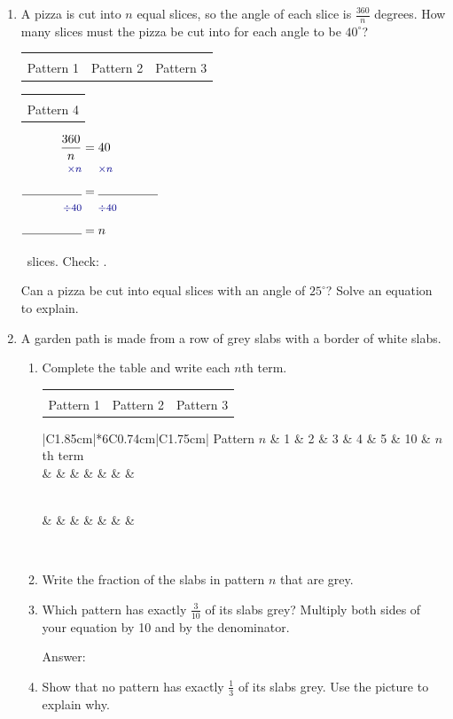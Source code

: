 \documentclass[11pt,a4paper]{article}
\makeatletter
\newcommand{\gap}{\underline{\hspace{0.95cm}}}
\newcommand{\ansline}[1][2.2cm]{\underline{\hspace{#1}}}
\newcommand{\workspace}[1]{\par\vspace{#1}\hfill Answer: \ansline[3.5cm]\par}
\newcommand{\rowstrut}{\rule[-1.9mm]{0pt}{5.8mm}}
\newenvironment{working}
  {\(\renewcommand{\arraystretch}{1.06}\begin{array}{@{}r@{\;}c@{\;}l@{}}}
  {\end{array}\)}
\newcommand{\opstyle}[1]{\text{\footnotesize\color{blue!55!black}$#1$}}
\newcommand{\bsop}[1]{\opstyle{#1} & & \opstyle{#1}\\}
\newcommand{\sidegap}[1][1.7cm]{\rule{0pt}{5.3mm}\rule{#1}{0.4pt}}
\newcommand{\eqlayout}[4]{%
  \begin{minipage}[c]{#1\linewidth}\raggedright #2\end{minipage}\hfill
  \begin{minipage}[c]{\dimexpr0.98\linewidth-#1\linewidth\relax}\centering #3\end{minipage}\par\smallskip
  #4}
\newcommand{\pic}[1]{\begin{tikzpicture}[baseline=(current bounding box.south)]#1\end{tikzpicture}}
\newcommand{\threepatterns}[3]{%
  \begin{tabular}{@{}c@{\hspace{10pt}}c@{\hspace{10pt}}c@{}}
    #1 & #2 & #3\\[-1pt]
    {\scriptsize Pattern 1} & {\scriptsize Pattern 2} & {\scriptsize Pattern 3}
  \end{tabular}}
\newcommand{\pizza}[1]{\pic{%
  \pgfmathtruncatemacro{\ang}{360/#1}
  \draw[fill=yellow!10,line width=0.6pt] (0,0) circle (0.5);
  \ifnum#1>1
    \foreach \k in {1,...,#1} {\draw (0,0) -- ({90+360*\k/#1}:0.5);}
    \draw[line width=0.4pt] (90:0.13) arc (90:{90+360/#1}:0.13);
    \node[font=\tiny,inner sep=0pt] at ({90+180/#1}:0.3) {$\ang^\circ$};
  \else
    \node[font=\tiny,inner sep=0pt] at (0,0) {$\ang^\circ$};
  \fi}}
\newcommand{\gardenpath}[1]{\pic{%
  \pgfmathtruncatemacro{\w}{#1+2}
  \draw[black!70,line width=0.4pt,step=0.28] (0,0) grid ({0.28*\w},0.84);
  \foreach \c in {1,...,#1} {\filldraw[fill=gray!55,draw=black!70,line width=0.4pt]
    ({0.28*\c},0.28) rectangle ++(0.28,0.28);}}}
\newenvironment{pictable}{%
  \setlength{\tabcolsep}{2pt}%
  \begin{tabular}{|C{1.85cm}|*{6}{C{0.74cm}|}C{1.75cm}|}\hline
  {\small Pattern $n$} & 1 & 2 & 3 & 4 & 5 & 10 & {\small $n$th term}\\\hline}
  {\end{tabular}}
\newcommand{\picrow}[1]{{\small #1} & & & & & & & \rowstrut\\\hline}
\makeatother
\begin{document}
\begin{enumerate}[resume]
\item A pizza is cut into $n$ equal slices, so the angle of each slice is
$\frac{360}{n}$ degrees. How many slices must the pizza be cut into for each angle to
be $40^\circ$?\par\smallskip
\eqlayout{0.55}
  {\centering\threepatterns{\pizza{1}}{\pizza{2}}{\pizza{3}}\hspace{10pt}%
   \begin{tabular}[b]{@{}c@{}}\pizza{4}\\[-1pt]{\scriptsize Pattern 4}\end{tabular}}
  {\begin{working}
     \dfrac{360}{n} & = & 40\\[4pt] \bsop{\times n}
     \sidegap & = & \sidegap\\ \bsop{\div 40}
     \sidegap & = & n
   \end{working}}
  {\gap\ slices. Check: \ansline[3.4cm].}\par\medskip
Can a pizza be cut into equal slices with an angle of $25^\circ$? Solve an equation to
explain.\par\vspace{1.6cm}\hrulefill

\item A garden path is made from a row of grey slabs with a border of white slabs.
\begin{enumerate}
\item Complete the table and write each $n$th term.\par
  \begin{minipage}[c]{0.4\linewidth}
  \threepatterns{\gardenpath{1}}{\gardenpath{2}}{\gardenpath{3}}
  \end{minipage}\hfill
  \begin{minipage}[c]{0.59\linewidth}\raggedleft
  \begin{pictable}\picrow{Grey slabs}\picrow{All slabs}\end{pictable}
  \end{minipage}
\item Write the fraction of the slabs in pattern $n$ that are grey. \ansline[2.5cm]
\item Which pattern has exactly $\frac{3}{10}$ of its slabs grey? Multiply both sides
  of your equation by 10 and by the denominator.
  \workspace{1.9cm}
\item Show that no pattern has exactly $\frac{1}{3}$ of its slabs grey. Use the picture
  to explain why.
  \vspace{1.5cm}\par\hrulefill
\end{enumerate}


\end{enumerate}
\end{document}
